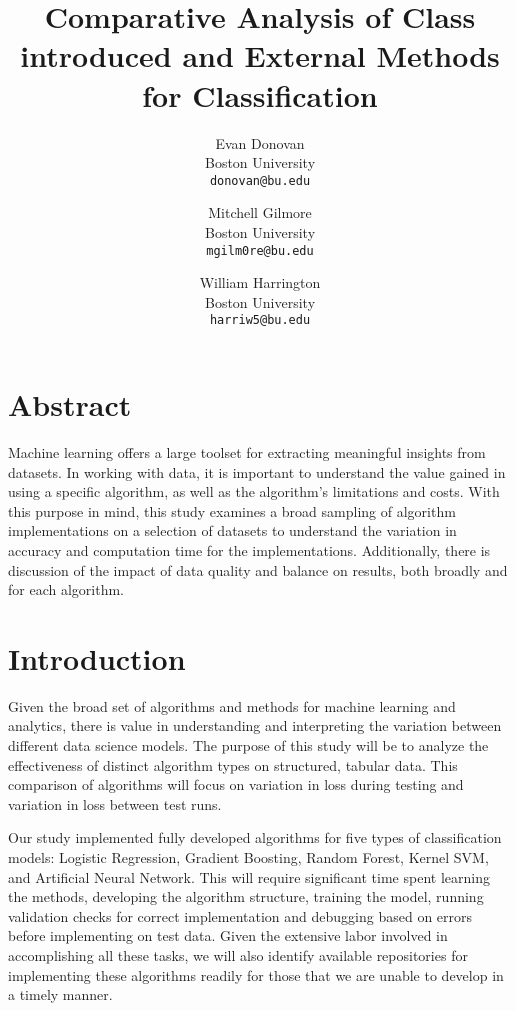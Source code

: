 \documentclass[10pt,twocolumn,letterpaper]{article}
\begin{document}
\title{Comparative Analysis of Class introduced and External Methods for Classification}

\author{Evan Donovan\\
  Boston University\\
  {\tt\small donovan@bu.edu}
  \and
  Mitchell Gilmore\\
  Boston University\\
  {\tt\small mgilm0re@bu.edu}
  \and
  William Harrington\\
  Boston University\\
  {\tt\small harriw5@bu.edu}
}
\maketitle

\section{Abstract}
\label{sec:intro}

Machine learning offers a large toolset for extracting meaningful insights from datasets.
In working with data, it is important to understand the value gained in using a specific algorithm, as well as the algorithm's limitations and costs. 
With this purpose in mind, this study examines a broad sampling of algorithm implementations on a selection of datasets to understand the variation in accuracy and computation time for the implementations.
Additionally, there is discussion of the impact of data quality and balance on results, both broadly and for each algorithm.

\section{Introduction}
\label{sec:intro}

Given the broad set of algorithms and methods for machine learning and analytics, there is value in understanding and interpreting the variation between different data science models.
The purpose of this study will be to analyze the effectiveness of distinct algorithm types on structured, tabular data.
This comparison of algorithms will focus on variation in loss during testing and variation in loss between test runs.

Our study implemented fully developed algorithms for five types of classification models: Logistic Regression, Gradient Boosting, Random Forest, Kernel SVM, and Artificial Neural Network.
This will require significant time spent learning the methods, developing the algorithm structure, training the model, running validation checks for correct implementation and debugging based on errors before implementing on test data.
Given the extensive labor involved in accomplishing all these tasks, we will also identify available repositories for implementing these algorithms readily for those that we are unable to develop in a timely manner.
\end{document}
